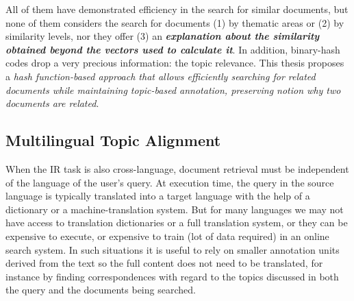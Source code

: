 All of them have demonstrated efficiency in the search for similar documents, but none of them considers the search for documents (1) by thematic areas or (2) by similarity levels, nor they offer (3) an \textbf{\textit{explanation about the similarity obtained beyond the vectors used to calculate it}}. In addition, binary-hash codes drop a very precious information: the topic relevance. This thesis proposes a \textit{hash function-based approach that allows efficiently searching for related documents while maintaining topic-based annotation, preserving notion why two documents are related}.


\subsection{Multilingual Topic Alignment}
\label{sec:multi-topic-alignment}

When the IR task is also cross-language, document retrieval must be independent of the language of the user's query. At execution time, the query in the source language is typically translated into a target language with the help of a dictionary or a machine-translation system. But for many languages we may not have access to translation dictionaries or a full translation system, or they can be expensive to execute, or expensive to train (lot of data required) in an online search system. In such situations it is useful to rely on smaller annotation units derived from the text so the full content does not need to be translated, for instance by finding correspondences with regard to the topics discussed in both the query and the documents being searched.

